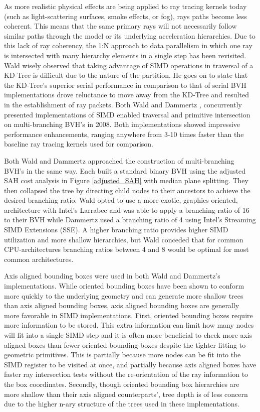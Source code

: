 As more realistic physical effects are being applied to ray tracing kernels
today (such as light-scattering surfaces, smoke effects, or fog), rays paths
become less coherent. This means that the same primary rays will not necessarily
follow similar paths through the model or its underlying acceleration
hierarchies. Due to this lack of ray coherency, the 1:N approach to data
parallelism in which one ray is intersected with many hierarchy elements in a
single step has been revisited. Wald wisely observed that taking
advantage of SIMD operations in traversal of a KD-Tree is difficult due to the
nature of the partition. He goes on to state that the KD-Tree's superior serial
performance in comparison to that of serial BVH implementations drove reluctance
to move away from the KD-Tree and resulted in the establishment of ray
packets. \cite{Wald_2008} Both Wald and Dammertz \cite{Dammertz_2008},
concurrently presented implementations of SIMD enabled traversal and primitive
intersection on multi-branching BVH's in 2008. Both implementations showed
impressive performance enhancements, ranging anywhere from 3-10 times faster
than the baseline ray tracing kernels used for comparison.

Both Wald and Dammertz approached the construction of multi-branching BVH's in
the same way. Each built a standard binary BVH using the adjusted SAH cost
analysis in Figure \ref{adjusted_SAH} with median plane splitting. They then
collapsed the tree by directing child nodes to their ancestors to achieve the
desired branching ratio. Wald opted to use a more exotic, graphics-oriented,
architecture with Intel's Larrabee and was able to apply a branching ratio of 16
to their BVH while Dammertz used a branching ratio of 4 using Intel's Streaming
SIMD Extensions (SSE). A higher branching ratio provides higher SIMD utilization
and more shallow hierarchies, but Wald conceded that for common CPU-architectures
branching ratios between 4 and 8 would be optimal for most common architectures.

Axis aligned bounding boxes were used in both Wald and Dammertz's
implementations. While oriented bounding boxes have been shown to conform more
quickly to the underlying geometry and can generate more shallow trees than axis
aligned bounding boxes, axis aligned bounding boxes are generally more favorable
in SIMD implementations. First, oriented bounding boxes require more
information to be stored. This extra information can limit how many nodes will fit into a single
SIMD step and it is often more beneficial to check more axis aligned boxes than
fewer oriented bounding boxes despite the tighter fitting to geometric
primitives. This is partially because more nodes can be fit into the SIMD
register to be visited at once, and partially because axis aligned boxes have
faster ray intersection tests without the re-orientation of the ray information
to the box coordinates. Secondly, though oriented bounding box hierarchies are
more shallow than their axis aligned counterparts', tree depth is of less
concern due to the higher n-ary structure of the trees used in these
implementations.


